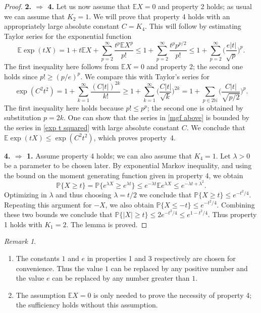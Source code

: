 \documentclass[10pt, openany]{book}
\theoremstyle{remark}
\newtheorem{remark}[theorem]{Remark}
\def \N {\mathbb{N}}
\def \E {\mathbb{E}}
\def \P {\mathbb{P}}
\def \l {\lambda}
\begin{document}
\begin{proof}
{\bf 2. $\Rightarrow$ 4.}  Let us now assume that $\E X = 0$ and property 2 holds; 
as usual we can assume that $K_2 = 1$. 
We will prove that property 4 holds with an appropriately large absolute constant $C = K_4$.
This will follow by estimating Taylor series for the exponential function
\begin{equation}										\label{mgf above}
\E \exp(tX) 
= 1 + t \E X + \sum_{p=2}^\infty \frac{t^p \E X^p}{p!} 
\le 1 +  \sum_{p=2}^\infty \frac{t^p p^{p/2}}{p!}	
\le 1 +  \sum_{p=2}^\infty \Big( \frac{e|t|}{\sqrt{p}} \Big)^p.
\end{equation}
The first inequality here follows from $\E X = 0$ and property 2; the second one holds since $p! \ge (p/e)^p$.
We compare this with Taylor's series for 
\begin{equation}										\label{exp t squared}
\exp(C^2 t^2) 
= 1 + \sum_{k=1}^\infty \frac{(C|t|)^{2k}}{k!}
\ge 1 + \sum_{k=1}^\infty \Big( \frac{C|t|}{\sqrt{k}} \Big)^{2k}
= 1 + \sum_{p \in 2\N} \Big( \frac{C|t|}{\sqrt{p/2}} \Big)^p.
\end{equation}
The first inequality here holds because $p! \le p^p$; the second one is obtained by substitution $p=2k$.
One can show that the series in \eqref{mgf above} is bounded by the series in \eqref{exp t squared} with large absolute constant $C$. 
We conclude that $\E \exp(tX) \le \exp(C^2 t^2)$, which proves property~4.

{\bf 4. $\Rightarrow$ 1.}
Assume property 4 holds; we can also assume that $K_4=1$. 
Let $\l > 0$ be a parameter to be chosen later. By exponential Markov inequality,
and using the bound on the moment generating function given in property 4, we obtain
$$
\P \{ X \ge t \} = \P \{ e^{\l X} \ge e^{\l t} \}
\le e^{-\l t} \E e^{\l X}
\le e^{-\l t + \l^2}.
$$
Optimizing in $\l$ and thus choosing $\l = t/2$ we conclude that 
$\P \{ X \ge t \} \le e^{-t^2/4}$.
Repeating this argument for $-X$, we also obtain $\P \{ X \le -t \} \le e^{-t^2/4}$.
Combining these two bounds we conclude that 
$\P \{ |X| \ge t \} \le 2 e^{-t^2/4} \le e^{1-t^2/4}$.
Thus property 1 holds with $K_1=2$.
The lemma is proved. 
\end{proof}

\begin{remark}
\begin{enumerate}
  \item The constants $1$ and $e$ in properties 1 and 3 respectively are chosen for convenience.
  Thus the value $1$ can be replaced by any positive number and the value $e$ can be replaced
  by any number greater than $1$.   
    
  \item The assumption $\E X = 0$ is only needed to prove the necessity of property 4;
  the sufficiency holds without this assumption. 
\end{enumerate}
\end{remark}
\end{document}
